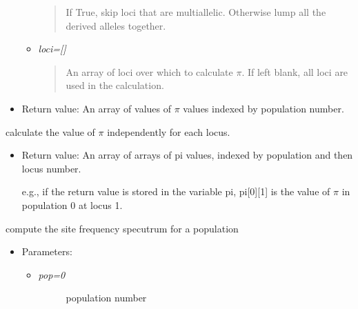 \documentclass[letterpaper,10pt,english]{sphinxmanual}
\begin{document}
\begin{fulllineitems}
\begin{fulllineitems}
\begin{itemize}
\begin{itemize}
\begin{quote}
If True, skip loci that are multiallelic.
Otherwise lump all the derived alleles together.
\end{quote}

\item {} 
\emph{loci={[}{]}}
\begin{quote}

An array of loci over which to calculate 
\(\pi\).  If left blank, all loci
are used in the calculation.
\end{quote}

\end{itemize}

\item {} 
Return value: An array of values of \(\pi\)
values indexed by population number.

\end{itemize}

\end{fulllineitems}


\begin{fulllineitems}
\label{index:sfs.Simulation.calc_pi_by_locus}
calculate the value of \(\pi\) independently for each locus.
\begin{itemize}
\item {} 
Return value: An array of arrays of pi values, indexed by 
population and then locus number.

e.g., if the return value is stored in the variable pi, 
pi{[}0{]}{[}1{]} is the value of \(\pi\) in population 0 at locus 1.

\end{itemize}

\end{fulllineitems}


\begin{fulllineitems}
\label{index:sfs.Simulation.get_sfs}
compute the site frequency specutrum for a population
\begin{itemize}
\item {} 
Parameters:
\begin{itemize}
\item {} \begin{description}
\item[{\emph{pop=0}}] \leavevmode
population number

\end{description}

\end{itemize}

\end{itemize}

\end{fulllineitems}


\end{fulllineitems}
\end{document}
